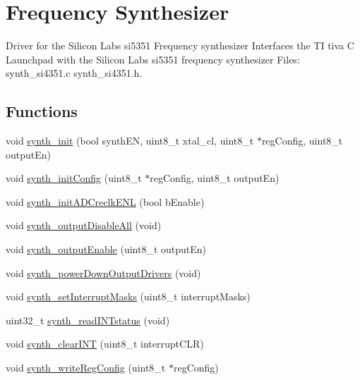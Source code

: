 \hypertarget{group__synth__si4351}{\section{Frequency Synthesizer}
\label{group__synth__si4351}
}


Driver for the Silicon Labs si5351 Frequency synthesizer Interfaces the T\+I tiva C Launchpad with the Silicon Labs si5351 frequency synthesizer Files\+: synth\+\_\+si4351.\+c synth\+\_\+si4351.\+h.  


\subsection*{Functions}
\begin{DoxyCompactItemize}
\item 
void \hyperlink{group__synth__si4351_gab6f548d82c6a4743a29ef36989e9f57b}{synth\+\_\+init} (bool synth\+E\+N, uint8\+\_\+t xtal\+\_\+cl, uint8\+\_\+t $\ast$reg\+Config, uint8\+\_\+t output\+En)
\item 
void \hyperlink{group__synth__si4351_ga8411f39546b1e0c34d940b2bc912b6d5}{synth\+\_\+init\+Config} (uint8\+\_\+t $\ast$reg\+Config, uint8\+\_\+t output\+En)
\item 
void \hyperlink{group__synth__si4351_ga7624250fdae39b3a90ca2d533181fac9}{synth\+\_\+init\+A\+D\+Creclk\+E\+N\+L} (bool b\+Enable)
\item 
void \hyperlink{group__synth__si4351_gaf4b54ebc93ba6ac72d83b07747e54874}{synth\+\_\+output\+Disable\+All} (void)
\item 
void \hyperlink{group__synth__si4351_ga5d4f7bca15364dd5928d9356698286d9}{synth\+\_\+output\+Enable} (uint8\+\_\+t output\+En)
\item 
void \hyperlink{group__synth__si4351_ga2f56d3941dc8c474d0940abe0bf945a1}{synth\+\_\+power\+Down\+Output\+Drivers} (void)
\item 
void \hyperlink{group__synth__si4351_gae90e773445ce3fd007180b7862fd787c}{synth\+\_\+set\+Interrupt\+Masks} (uint8\+\_\+t interrupt\+Masks)
\item 
uint32\+\_\+t \hyperlink{group__synth__si4351_ga4267214a41e82d3245f92d255da7cdb2}{synth\+\_\+read\+I\+N\+Tstatus} (void)
\item 
void \hyperlink{group__synth__si4351_ga9f5a1af96b53dbdd3499f140001c1fc6}{synth\+\_\+clear\+I\+N\+T} (uint8\+\_\+t interrupt\+C\+L\+R)
\item 
void \hyperlink{group__synth__si4351_ga725408d092dbec1348ddc5fb166bccdb}{synth\+\_\+write\+Reg\+Config} (uint8\+\_\+t $\ast$reg\+Config)

\end{DoxyCompactItemize}
